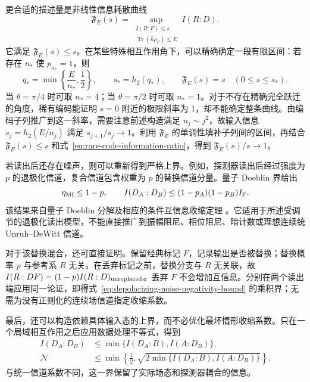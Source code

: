 \documentclass[UTF8,11pt,a4paper,fontset=none]{ctexart}
\begin{document}
更合适的描述量是非线性信息耗散曲线
\begin{equation}
\mathfrak F_E(s)=
\sup_{\substack{I(R:F)\leq s\\ \operatorname{Tr}(\hat n\rho_F)\leq E}}
I(R:D).
\label{eq:quantum-information-dissipation-curve}
\end{equation}
它满足 $\mathfrak F_E(s)\leq s$。在某些特殊相互作用角下，可以精确确定一段有限区间：若存在 $n_*$ 使 $p_{n_*}=1$，则
\begin{equation}
q_*=\min\left\{\frac{E}{n_*},\frac12\right\},\qquad
s_*=h_2(q_*),\qquad
\mathfrak F_E(s)=s\quad(0\leq s\leq s_*).
\label{eq:jc-exact-linear-curve-segment}
\end{equation}
当 $\theta=\pi/4$ 时可取 $n_*=4$；当 $\theta=\pi/2$ 时可取 $n_*=1$。对于不存在精确完全跃迁的角度，稀有编码能证明 $s=0$ 附近的极限斜率为 1，却不能确定整条曲线。由编码子列推广到这一斜率，需要注意前述构造满足 $n_j\sim j^2$，故输入信息 $s_j=h_2(E/n_j)$ 满足 $s_{j+1}/s_j\to1$。利用 $\mathfrak F_E$ 的单调性填补子列间的区间，再结合 $\mathfrak F_E(s)\leq s$ 和式~\eqref{eq:rare-code-information-ratio}，得到 $\mathfrak F_E(s)/s\to1$。

若读出后还存在噪声，则可以重新得到严格上界。例如，探测器读出后经过强度为 $p$ 的退极化信道，复合信道包含权重为 $p$ 的替换信道分量。量子 Doeblin 界给出
\begin{equation}
\eta_{\rm MI}\leq1-p,\qquad
I(D_A:D_B)\leq(1-p_A)(1-p_B)I_{\rm F}.
\label{eq:depolarizing-noise-negativity-bound}
\end{equation}
该结果来自量子 Doeblin 分解及相应的条件互信息收缩定理 \cite{GeorgeHircheNuradhaWilde2026Doeblin,HircheGeorgeNuradhaWilde2026Conditional}。它适用于所述受调节的退极化读出模型，不能直接推广到振幅阻尼、相位阻尼、暗计数或理想连续统 Unruh--DeWitt 信道。

对于该替换混合，还可直接证明。保留经典标记 $F$，记录输出是否被替换；替换概率 $p$ 与参考系 $R$ 无关。在丢弃标记之前，替换分支与 $R$ 无关联，故 $I(R:DF)=(1-p)I(R:D)_{\rm unreplaced}$。丢弃 $F$ 不会增加互信息。分别在两个读出端应用同一论证，即得式~\eqref{eq:depolarizing-noise-negativity-bound} 的乘积界；无需为没有正则化的连续场信道指定收缩系数。

最后，还可以构造依赖具体输入态的上界，而不必优化最坏情形收缩系数。只在一个局域相互作用之后应用数据处理不等式，得到
\begin{align}
I(D_A:D_B)&\leq\min\{I(D_A:B),I(A:D_B)\},\nonumber\\
\mathcal N&\leq\min\left\{\frac12,
\sqrt{2\min\{I(D_A:B),I(A:D_B)\}}\right\}.
\label{eq:one-sided-negativity-bound}
\end{align}
与统一信道系数不同，这一界保留了实际场态和探测器耦合的信息。
\end{document}
